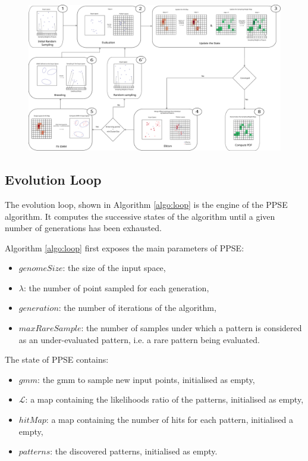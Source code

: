 \documentclass[10pt,letterpaper]{article}
\theoremstyle{definition}
\theoremstyle{remark}
\begin{document}
\begin{figure}
 \centering
  \includegraphics[width=\linewidth]{images/schemaalgo.pdf}%
\end{figure}


\subsection*{Evolution Loop}

The evolution loop, shown in Algorithm \ref{algo:loop} is the engine of the PPSE algorithm.
It computes the successive states of the algorithm until a given number of generations has been exhausted.

Algorithm \ref{algo:loop} first exposes the main parameters of PPSE:
\begin{itemize}
    \item $genomeSize$: the size of the input space,
    \item $\lambda$: the number of point sampled for each generation,
    \item $generation$: the number of iterations of the algorithm,
    \item $maxRareSample$: the number of samples under which a pattern is considered as an under-evaluated pattern, i.e. a rare pattern being evaluated.
\end{itemize}

The state of PPSE contains:
\begin{itemize}
    \item $gmm$: the gmm to sample new input points, initialised as empty,
    \item $\mathcal{L}$: a map containing the likelihoods ratio of the patterns, initialised as empty,
    \item $hitMap$: a map containing the number of hits for each pattern, initialised a empty,
    \item $patterns$: the discovered patterns, initialised as empty.
\end{itemize}
\end{document}

